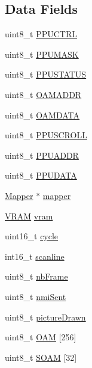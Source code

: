 \subsection*{Data Fields}
\begin{DoxyCompactItemize}
\item 
uint8\+\_\+t \hyperlink{struct_p_p_u_af3b4f665eb5f55ad9b2919464e19c64a}{P\+P\+U\+C\+T\+RL}
\item 
uint8\+\_\+t \hyperlink{struct_p_p_u_a6ec06ed9d7a2fd84300fc764e3e96672}{P\+P\+U\+M\+A\+SK}
\item 
uint8\+\_\+t \hyperlink{struct_p_p_u_a7773485ae6289f9a57d30d4a66458581}{P\+P\+U\+S\+T\+A\+T\+US}
\item 
uint8\+\_\+t \hyperlink{struct_p_p_u_ad52128da7e77b60540403b30502961de}{O\+A\+M\+A\+D\+DR}
\item 
uint8\+\_\+t \hyperlink{struct_p_p_u_a9665053d5b09aed492922e997f29e7ea}{O\+A\+M\+D\+A\+TA}
\item 
uint8\+\_\+t \hyperlink{struct_p_p_u_a192557bebe1fba78011e23552e245f35}{P\+P\+U\+S\+C\+R\+O\+LL}
\item 
uint8\+\_\+t \hyperlink{struct_p_p_u_aa2fbeb7a018d444d942c9998968251a9}{P\+P\+U\+A\+D\+DR}
\item 
uint8\+\_\+t \hyperlink{struct_p_p_u_a21e9356a3ea5f41d1ba6fc9782e953e5}{P\+P\+U\+D\+A\+TA}
\item 
\hyperlink{struct_mapper}{Mapper} $\ast$ \hyperlink{struct_p_p_u_a2a9230344a369ccd1d395edd03dd6827}{mapper}
\item 
\hyperlink{struct_v_r_a_m}{V\+R\+AM} \hyperlink{struct_p_p_u_abc329fd3bb95268164f54c040118ab9c}{vram}
\item 
uint16\+\_\+t \hyperlink{struct_p_p_u_a27eb4db4e065eac424e15c0c6569d1d7}{cycle}
\item 
int16\+\_\+t \hyperlink{struct_p_p_u_aeb74e7c9eef1621e3ffe44360ddbf703}{scanline}
\item 
uint8\+\_\+t \hyperlink{struct_p_p_u_a91e5e30500bc47619f6002b304d4871d}{nb\+Frame}
\item 
uint8\+\_\+t \hyperlink{struct_p_p_u_ab4122702865e26c18ac2bf11ff2db948}{nmi\+Sent}
\item 
uint8\+\_\+t \hyperlink{struct_p_p_u_a5f7a6e84f511fc321dd7206d331d778a}{picture\+Drawn}
\item 
uint8\+\_\+t \hyperlink{struct_p_p_u_a3b60c82c8daf2a08b49d8bda55d7d819}{O\+AM} \mbox{[}256\mbox{]}
\item 
uint8\+\_\+t \hyperlink{struct_p_p_u_a47d494976b32bbdde6b2a0947132686d}{S\+O\+AM} \mbox{[}32\mbox{]}

\end{DoxyCompactItemize}
